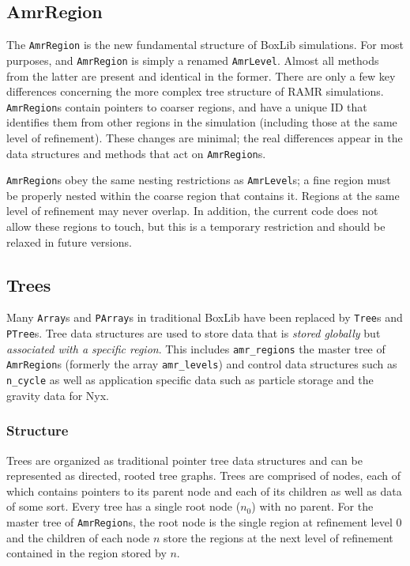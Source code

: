 \documentclass[11pt]{article}
\newcommand{\AR}{{\tt AmrRegion}}
\newcommand{\AL}{{\tt AmrLevel}}
\begin{document}
\subsection{AmrRegion}
\label{amrregion}
The \AR{} is the new fundamental structure of BoxLib simulations. For 
most purposes, and \AR{} is simply a renamed \AL{}. Almost all methods 
from the latter are present and identical in the former. There are 
only a few key differences concerning the more complex tree structure 
of RAMR simulations. \AR{}s contain pointers to coarser regions, 
and have a unique ID that identifies them from other regions in the 
simulation (including those at the same level of refinement). These 
changes are minimal; the real differences appear in the data 
structures and  methods that act on \AR{}s.

\AR{}s obey the same nesting restrictions as \AL{}s; a fine region 
must be properly nested within the coarse region that contains it. 
Regions at the same level of refinement  may never overlap. In 
addition, the current code does not allow these regions to touch, but 
this is a temporary restriction and should be relaxed in future 
versions.

\subsection{Trees}
\label{trees}

Many {\tt Array}s and {\tt PArray}s in traditional BoxLib have been 
replaced by {\tt Tree}s and {\tt PTree}s. Tree data structures are 
used to store data that is \emph{stored globally} but \emph
{associated with a specific region}. This includes {\tt amr\_regions} the 
master tree of \AR{}s (formerly the array {\tt amr\_levels}) and control 
data structures such as {\tt n\_cycle} as well as application specific 
data such as particle storage and the gravity data for Nyx.

\subsubsection{Structure}
Trees are organized as traditional pointer tree data structures and 
can be represented as directed, rooted tree graphs. 
Trees are comprised of nodes, each of which contains pointers to its 
parent node and each of its children as well as data of some sort. 
Every tree has a single root node ($n_0$) with no parent. For the master 
tree of \AR{}s, the root node is the single region at refinement 
level 0 and the children of each node $n$ store the regions %
at the next level of refinement contained in the region stored by $n$. 
\end{document}
